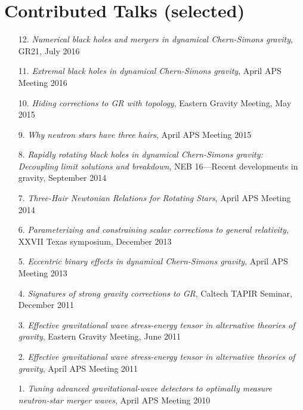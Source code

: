 \section{\sc Contributed Talks (selected)}
\begin{enumerate}
\item[{12.}]
  {\it Numerical black holes and mergers in dynamical
    Chern-Simons gravity},
  GR21, July 2016
\item[{11.}]
  {\it Extremal black holes in dynamical Chern-Simons gravity},
  April APS Meeting 2016
\item[{10.}]
  {\it Hiding corrections to GR with topology},
  Eastern Gravity Meeting, May 2015
\item[{9.}]
  {\it Why neutron stars have three hairs},
  April APS Meeting 2015
\item[{8.}]
  {\it Rapidly rotating black holes in dynamical Chern-Simons gravity:
    Decoupling limit solutions and breakdown},
  NEB 16---Recent developments in gravity, September 2014
\item[{7.}]
  {\it Three-Hair Newtonian Relations for Rotating Stars},
  April APS Meeting 2014
\item[{6.}]
  {\it Parameterizing and constraining scalar corrections to general relativity},
 XXVII Texas symposium, December 2013
\item[{5.}]
  {\it Eccentric binary effects in dynamical Chern-Simons gravity},
  April APS Meeting 2013
\item[{4.}]
  {\it Signatures of strong gravity corrections to GR},
  Caltech TAPIR Seminar, December 2011
\item[{3.}]
  {\it Effective gravitational wave stress-energy tensor in alternative theories of gravity},
  Eastern Gravity Meeting, June 2011
\item[{2.}]
  {\it Effective gravitational wave stress-energy tensor in alternative theories of gravity},
  April APS Meeting 2011
\item[{1.}]
  {\it Tuning advanced gravitational-wave detectors to optimally measure neutron-star merger waves},
  April APS Meeting 2010
\end{enumerate}


